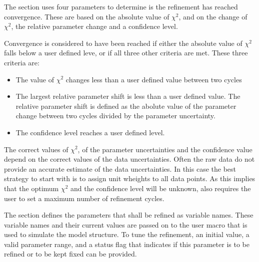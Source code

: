 The \Refine section uses four parameters to determine is the refinement has 
reached convergence. These are based on the absolute value of $\chi^2$, and
on the change of $\chi^2$, the relative parameter change and a confidence level.

Convergence is considered to have been reached if either the absolute value
of $\chi^2$ falls below a user defined leve, or if all three other criteria
are met. These three criteria are:
\begin{itemize}
  \item The value of $\chi^2$ changes less than a user defined value between 
        two cycles
  \item The largest relative parameter shift is less than a user defined value.
        The relative parameter shift is defined as the abolute value of the
        parameter change between two cycles divided by the parameter uncertainty.
  \item The confidence level reaches a user defined level.
\end{itemize}

The correct values of $\chi^2$, of the parameter uncertainties and the 
confidence value depend on the correct values of the data uncertainties. Often
the raw data do not provide an accurate estimate of the data uncertainties. In
this case the best strategy to start with is to assign unit wheights to all data 
points. As this implies that the optimum $\chi^2$ and the confidence level will
be unknown, \Refine also requires the user to set a maximum number of refinement 
cycles. 

The \Refine section defines the parameters that shall be refined as \Suite 
variable names. These variable names and their current values are passed on to
the user macro that is used to simulate the model structure. To tune the 
refinement, an initial value, a valid parameter range, and a status flag that 
indicates if this parameter is to be refined or to be kept fixed can be provided.
 

